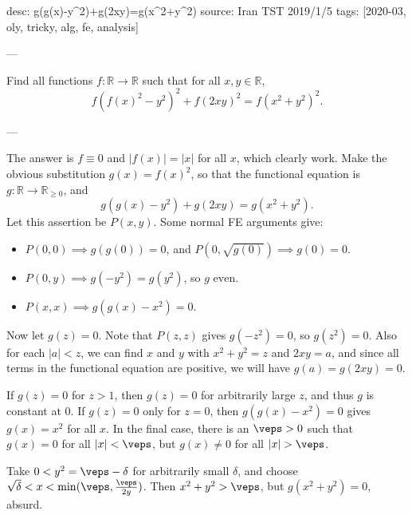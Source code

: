 desc: g(g(x)-y^2)+g(2xy)=g(x^2+y^2)
source: Iran TST 2019/1/5
tags: [2020-03, oly, tricky, alg, fe, analysis]

---

Find all functions $f:\mathbb R\to\mathbb R$ such that for all $x,y\in\mathbb R$, \[f\left(f(x)^2-y^2\right)^2+f(2xy)^2=f\left(x^2+y^2\right)^2.\]

---

The answer is $f\equiv0$ and $|f(x)|=|x|$ for all $x$, which clearly work. Make the obvious substitution $g(x)=f(x)^2$, so that the functional equation is $g:\mathbb R\to\mathbb R_{\ge0}$, and \[g\left(g(x)-y^2\right)+g(2xy)=g\left(x^2+y^2\right).\]
Let this assertion be $P(x,y)$. Some normal FE arguments give:
\begin{itemize}[itemsep=0em]
    \item $P(0,0)\implies g(g(0))=0$, and $P(0,\sqrt{g(0)})\implies\boxed{g(0)=0}$.
    \item $P(0,y)\implies g(-y^2)=g(y^2)$, so $\boxed{g\text{ even}}$.
    \item $P(x,x)\implies\boxed{g(g(x)-x^2)=0}$.
\end{itemize}
Now let $g(z)=0$. Note that $P(z,z)$ gives $g(-z^2)=0$, so $g(z^2)=0$. Also for each $|a|<z$, we can find $x$ and $y$ with $x^2+y^2=z$ and $2xy=a$, and since all terms in the functional equation are positive, we will have $g(a)=g(2xy)=0$.

If $g(z)=0$ for $z>1$, then $g(z)=0$ for arbitrarily large $z$, and thus $g$ is constant at $0$. If $g(z)=0$ only for $z=0$, then $g(g(x)-x^2)=0$ gives $g(x)=x^2$ for all $x$. In the final case, there is an $\veps>0$ such that $g(x)=0$ for all $|x|<\veps$, but $g(x)\ne0$ for all $|x|>\veps$.

Take $0<y^2=\veps-\delta$ for arbitrarily small $\delta$, and choose $\sqrt{\delta}<x<\min(\veps,\tfrac{\veps}{2y})$. Then $x^2+y^2>\veps$, but $g(x^2+y^2)=0$, absurd.
